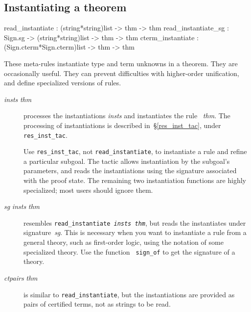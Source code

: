 \subsection{Instantiating a theorem} 
\begin{ttbox} 
read_instantiate    :            (string*string)list -> thm -> thm
read_instantiate_sg : Sign.sg -> (string*string)list -> thm -> thm
cterm_instantiate   :    (Sign.cterm*Sign.cterm)list -> thm -> thm
\end{ttbox}
These meta-rules instantiate type and term unknowns in a theorem.  They are
occasionally useful.  They can prevent difficulties with higher-order
unification, and define specialized versions of rules.
\begin{description}
\item[ {\it insts} {\it thm}] 
processes the instantiations {\it insts} and instantiates the rule~{\it
thm}.  The processing of instantiations is described
in~\S\ref{res_inst_tac}, under {\tt res_inst_tac}.  

Use {\tt res_inst_tac}, not {\tt read_instantiate}, to instantiate a rule
and refine a particular subgoal.  The tactic allows instantiation by the
subgoal's parameters, and reads the instantiations using the signature
associated with the proof state.  The remaining two instantiation functions
are highly specialized; most users should ignore them.

\item[ {\it sg} {\it insts} {\it thm}] 
resembles \hbox{\tt read_instantiate {\it insts} {\it thm}}, but reads the
instantiates under signature~{\it sg}.  This is necessary when you want to
instantiate a rule from a general theory, such as first-order logic, using
the notation of some specialized theory.  Use the function {\tt
sign_of} to get the signature of a theory.

\item[ {\it ctpairs} {\it thm}] 
is similar to {\tt read_instantiate}, but the instantiations are provided
as pairs of certified terms, not as strings to be read.
\end{description}


